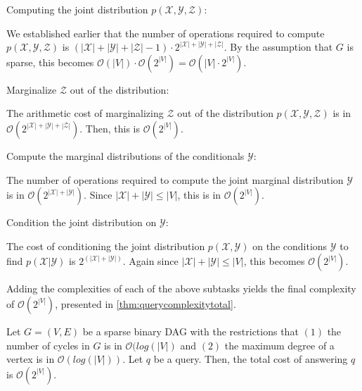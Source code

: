 Computing the joint distribution $p(\mathcal{X},\mathcal{Y},\mathcal{Z})$:
\begin{myindentpar}{1.5em}
We established earlier that the number of operations required to compute $p(\mathcal{X},\mathcal{Y},\mathcal{Z})$ is $(|\mathcal{X}|+|\mathcal{Y}|+ |\mathcal{Z}|-1)\cdot 2^{|\mathcal{X}|+|\mathcal{Y}|+|\mathcal{Z}|}$. By the assumption that $G$ is sparse, this becomes $\mathcal{O}(|V|) \cdot \mathcal{O}(2^{|V|}) = \mathcal{O}(|V|\cdot 2^{|V|})$.\newline
\end{myindentpar}

Marginalize $\mathcal{Z}$ out of the distribution:
\begin{myindentpar}{1.5em}
The arithmetic cost of marginalizing $\mathcal{Z}$ out of the distribution $p(\mathcal{X},\mathcal{Y},\mathcal{Z})$ is in $\mathcal{O}(2^{|\mathcal{X}|+|\mathcal{Y}|+|\mathcal{Z}|})$. Then, this is $\mathcal{O}(2^{|V|})$. \newline
\end{myindentpar}

Compute the marginal distributions of the conditionals $\mathcal{Y}$:
\begin{myindentpar}{1.5em}
The number of operations required to compute the joint marginal distribution $\mathcal{Y}$ is in $\mathcal{O}(2^{|\mathcal{X}|+|\mathcal{Y}|})$. Since $|\mathcal{X}| + |\mathcal{Y}| \leq |V|$, this is in $\mathcal{O}(2^{|V|})$. \newline
\end{myindentpar}

Condition the joint distribution on $\mathcal{Y}$:
\begin{myindentpar}{1.5em}
The cost of conditioning the joint distribution $p(\mathcal{X},\mathcal{Y})$ on the conditions $\mathcal{Y}$ to find $p(\mathcal{X}|\mathcal{Y})$ is $2^{(|\mathcal{X}| + |\mathcal{Y}|)}$. Again since $|\mathcal{X}| + |\mathcal{Y}| \leq |V|$, this becomes $\mathcal{O}(2^{|V|})$. \newline
\end{myindentpar}

Adding the complexities of each of the above subtasks yields the final complexity of $\mathcal{O}(2^{|V|})$, presented in \cref{thm:querycomplexitytotal}.

\begin{theorem}\label{thm:querycomplexitytotal}
 Let $G = (V,E)$ be a sparse binary DAG with the restrictions that $(1)$ the number of cycles in $G $ is in $\mathcal{O}(log(|V|)$ and $(2)$ the maximum degree of a vertex is in $\mathcal{O}(log(|V|))$. Let $q$ be a query. Then, the total cost of answering $q$ is $\mathcal{O}(2^{|V|})$.
\end{theorem}

